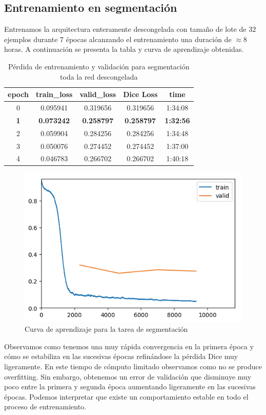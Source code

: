 \subsection{Entrenamiento en segmentación}
Entrenamos la arquitectura enteramente descongelada con tamaño de lote de $32$ ejemplos durante $7$ épocas alcanzando el entrenamiento una duración de $ \approx 8$ horas. A continuación se presenta la tabla y curva de aprendizaje obtenidas.
\begin{table}[H]
	\centering
	\begin{tabular}{|ccccc|}
		\toprule
		epoch & train\_loss & valid\_loss & Dice Loss & time \\ 
		\midrule
		0 & 0.095941 & 0.319656 & 0.319656 & 1:34:08 \\ 
		\textbf{1} & \textbf{0.073242} & \textbf{0.258797} & \textbf{0.258797} & \textbf{1:32:56} \\ 
		2 & 0.059904 & 0.284256 & 0.284256 & 1:34:48 \\ 
		3 & 0.050076 & 0.274452 & 0.274452 & 1:37:00 \\ 
		4 & 0.046783 & 0.266702 & 0.266702 & 1:40:18 \\ 
		\bottomrule
	\end{tabular}
	\caption{Pérdida de entrenamiento y validación para segmentación toda la red descongelada}
	\label{tabla:resultados4}
\end{table}

\begin{figure}[H]
	\centering
	\includegraphics[width=0.7\linewidth]{imagenes/curva_segmentation.png}
	\caption{Curva de aprendizaje para la tarea de segmentación}
\end{figure}

Observamos como tenemos una muy rápida convergencia en la primera época y cómo se estabiliza en las sucesivas épocas refinándose la pérdida Dice muy ligeramente. En este tiempo de cómputo limitado observamos como no se produce overfitting. Sin embargo, obtenemos un error de validación que disminuye muy poco entre la primera y segunda época aumentando ligeramente en las sucesivas épocas. Podemos interpretar que existe un comportamiento estable en todo el proceso de entrenamiento.

